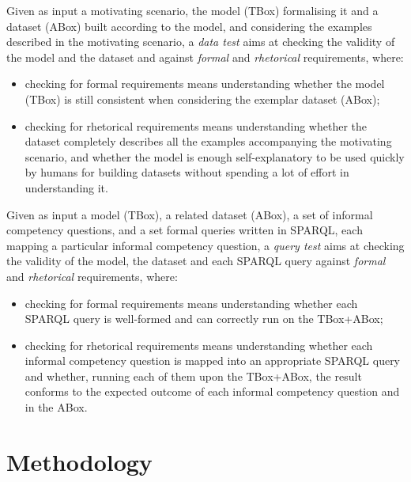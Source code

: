 \documentclass[runningheads,a4paper]{llncs}
\begin{document}
Given as input a motivating scenario, the model (TBox) formalising it and a dataset (ABox) built according to the model, and considering the examples described in the motivating scenario, a {\em data test} aims at checking the validity of the model and the dataset and against {\em formal} and {\em rhetorical} requirements, where:
\begin{itemize}
\item checking for formal requirements means understanding whether the model (TBox) is still consistent when considering the exemplar dataset (ABox);
\item checking for rhetorical requirements means understanding whether the dataset completely describes all the examples accompanying the motivating scenario, and whether the model is enough self-explanatory to be used quickly by humans for building datasets without spending a lot of effort in understanding it.
\end{itemize}

Given as input a model (TBox), a related dataset (ABox), a set of informal competency questions, and a set formal queries written in SPARQL, each mapping a particular informal competency question, a {\em query test} aims at checking the validity of the model, the dataset and each SPARQL query against {\em formal} and {\em rhetorical} requirements, where:
\begin{itemize}
\item checking for formal requirements means understanding whether each SPARQL query is well-formed and can correctly run on the TBox+ABox;
\item checking for rhetorical requirements means understanding whether each informal competency question is mapped into an appropriate SPARQL query and whether, running each of them upon the TBox+ABox, the result conforms to the expected outcome of each informal competency question and in the ABox.
\end{itemize}

\section{Methodology}\label{__RefHeading__2377_1461357291}
\end{document}
